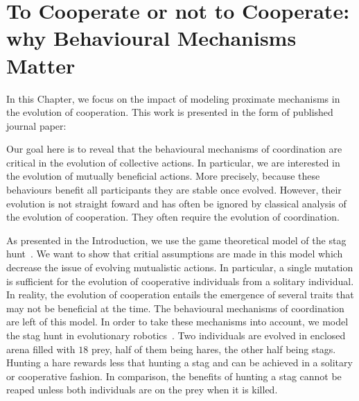 \chapter{To Cooperate or not to Cooperate: why Behavioural Mechanisms Matter}
\label{chapter:C1_article1}

\minitoc[n] %

In this Chapter, we focus on the impact of modeling proximate mechanisms in the evolution of cooperation. This work is presented in the form of published journal paper:

\begin{quote}
\end{quote}

Our goal here is to reveal that the behavioural mechanisms of coordination are critical in the evolution of collective actions. In particular, we are interested in the evolution of mutually beneficial actions. More precisely, because these behaviours benefit all participants they are stable once evolved. However, their evolution is not straight foward and has often be ignored by classical analysis of the evolution of cooperation. They often require the evolution of coordination.

As presented in the Introduction, we use the game theoretical model of the stag hunt~\parencite{Skyrms2004}. We want to show that critial assumptions are made in this model which decrease the issue of evolving mutualistic actions. In particular, a single mutation is sufficient for the evolution of cooperative individuals from a solitary individual. In reality, the evolution of cooperation entails the emergence of several traits that may not be beneficial at the time. The behavioural mechanisms of coordination are left of this model. In order to take these mechanisms into account, we model the stag hunt in evolutionary robotics~\parencite{Nolfi2000, Doncieux2015}. Two individuals are evolved in enclosed arena filled with $18$ prey, half of them being hares, the other half being stags. Hunting a hare rewards less that hunting a stag and can be achieved in a solitary or cooperative fashion. In comparison, the benefits of hunting a stag cannot be reaped unless both individuals are on the prey when it is killed.

